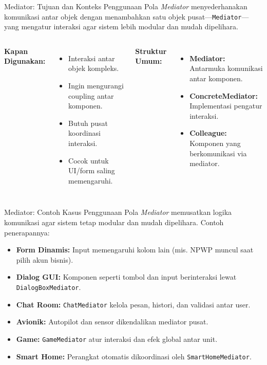 \documentclass[aspectratio=169, table]{beamer}
\begin{document}
\begin{frame}{Mediator: Tujuan dan Konteks Penggunaan}
	\vspace{6pt}
	Pola \textit{Mediator} menyederhanakan komunikasi antar objek dengan menambahkan satu objek pusat—\texttt{Mediator}—yang mengatur interaksi agar sistem lebih modular dan mudah dipelihara.
	
	\vspace{8pt}
	\begin{columns}[T]
		\textbf{Kapan Digunakan:}
		\begin{itemize}
			\item Interaksi antar objek kompleks.
			\item Ingin mengurangi coupling antar komponen.
			\item Butuh pusat koordinasi interaksi.
			\item Cocok untuk UI/form saling memengaruhi.
		\end{itemize}
		
		\textbf{Struktur Umum:}
		\begin{itemize}
			\item \textbf{Mediator:} Antarmuka komunikasi antar komponen.
			\item \textbf{ConcreteMediator:} Implementasi pengatur interaksi.
			\item \textbf{Colleague:} Komponen yang berkomunikasi via mediator.
		\end{itemize}
	\end{columns}
\end{frame}



\begin{frame}{Mediator: Contoh Kasus Penggunaan}
	\vspace{6pt}
	Pola \textit{Mediator} memusatkan logika komunikasi agar sistem tetap modular dan mudah dipelihara. Contoh penerapannya:
	
	\vspace{4pt}
	\begin{itemize}
		\item \textbf{Form Dinamis:} Input memengaruhi kolom lain (mis. NPWP muncul saat pilih akun bisnis).
		\item \textbf{Dialog GUI:} Komponen seperti tombol dan input berinteraksi lewat \texttt{DialogBoxMediator}.
		\item \textbf{Chat Room:} \texttt{ChatMediator} kelola pesan, histori, dan validasi antar user.
		\item \textbf{Avionik:} Autopilot dan sensor dikendalikan mediator pusat.
		\item \textbf{Game:} \texttt{GameMediator} atur interaksi dan efek global antar unit.
		\item \textbf{Smart Home:} Perangkat otomatis dikoordinasi oleh \texttt{SmartHomeMediator}.
	\end{itemize}
\end{frame}
\end{document}

